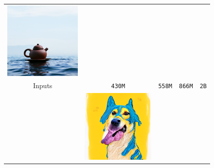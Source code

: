 \begin{figure}[!ht]
\begin{tabular}[t]{c c c c c}
    \includegraphics[width=\xwidth]{cp2/figures/dreambooth/teapot/c512_checkpoint_499.png} \\
    Inputs & \texttt{430M} &  \texttt{558M} &  \texttt{866M} &  \texttt{2B} \\
    &
    \includegraphics[width=\xwidth]{cp2/figures/dreambooth/dog/c96_checkpoint_99.png} &

\end{tabular}
\end{figure}
